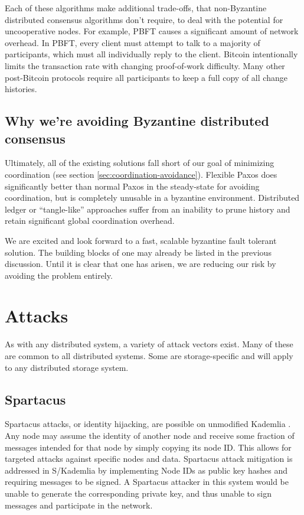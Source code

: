 \documentclass[8pt,fleqn,openany]{book}
\begin{document}
Each of these algorithms make
additional trade-offs, that non-Byzantine distributed consensus algorithms don't
require, to deal with the potential for uncooperative nodes. For example,
PBFT \cite{pbft} causes a significant amount of network overhead. In PBFT, every
client must attempt to talk to a majority of participants, which must all
individually reply to the client. Bitcoin
\cite{bitcoin} intentionally limits the transaction rate with changing
proof-of-work difficulty. Many other post-Bitcoin protocols require all
participants to keep a full copy of all change histories.

\section{Why we're avoiding Byzantine distributed consensus}

Ultimately, all of the existing solutions fall short of our goal of minimizing
coordination (see section \ref{sec:coordination-avoidance}). Flexible Paxos
\cite{paxos-flexible} does significantly better than normal Paxos in the
steady-state for avoiding coordination, but is completely unusable in a
byzantine environment. Distributed ledger or ``tangle-like'' approaches suffer
from an inability to prune history and retain significant global coordination
overhead.

We are excited and look forward to a fast, scalable byzantine fault tolerant
solution. The building blocks of one may already be listed in the previous
discussion. Until it is clear that one has arisen, we are reducing our risk
by avoiding the problem entirely.

\chapter{Attacks}

As with any distributed system, a variety of attack vectors exist. Many of these
are common to all distributed systems. Some are storage-specific and will apply
to any distributed storage system.

\section{Spartacus}

Spartacus attacks, or identity hijacking, are possible on unmodified Kademlia
\cite{kad}.
Any node may assume the identity of another node and receive some fraction of
messages intended for that node by simply copying its node ID.
This allows for targeted attacks against specific nodes and data.
Spartacus attack mitigation is addressed in S/Kademlia \cite{skad} by
implementing Node IDs as public key hashes and requiring messages to be signed.
A Spartacus attacker in this system would be unable to generate the
corresponding private key, and thus unable to sign messages and participate in
the network.
\end{document}

